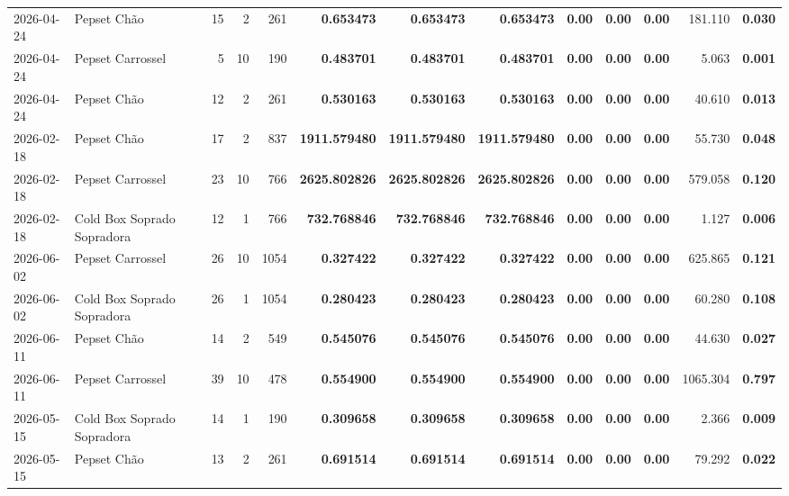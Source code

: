 {\begin{center}
{\begin{tabular}{@{}llrrrrrrrrrrr@{}}
2026-04-24 & Pepset Chão & 15 & 2 & 261 & \textbf{0.653473} & \textbf{0.653473} & \textbf{0.653473} & \textbf{0.00} & \textbf{0.00} & \textbf{0.00} & 181.110 & \textbf{0.030} \\
2026-04-24 & Pepset Carrossel & 5 & 10 & 190 & \textbf{0.483701} & \textbf{0.483701} & \textbf{0.483701} & \textbf{0.00} & \textbf{0.00} & \textbf{0.00} & 5.063 & \textbf{0.001} \\
2026-04-24 & Pepset Chão & 12 & 2 & 261 & \textbf{0.530163} & \textbf{0.530163} & \textbf{0.530163} & \textbf{0.00} & \textbf{0.00} & \textbf{0.00} & 40.610 & \textbf{0.013} \\
2026-02-18 & Pepset Chão & 17 & 2 & 837 & \textbf{1911.579480} & \textbf{1911.579480} & \textbf{1911.579480} & \textbf{0.00} & \textbf{0.00} & \textbf{0.00} & 55.730 & \textbf{0.048} \\
2026-02-18 & Pepset Carrossel & 23 & 10 & 766 & \textbf{2625.802826} & \textbf{2625.802826} & \textbf{2625.802826} & \textbf{0.00} & \textbf{0.00} & \textbf{0.00} & 579.058 & \textbf{0.120} \\
2026-02-18 & Cold Box Soprado Sopradora & 12 & 1 & 766 & \textbf{732.768846} & \textbf{732.768846} & \textbf{732.768846} & \textbf{0.00} & \textbf{0.00} & \textbf{0.00} & 1.127 & \textbf{0.006} \\
2026-06-02 & Pepset Carrossel & 26 & 10 & 1054 & \textbf{0.327422} & \textbf{0.327422} & \textbf{0.327422} & \textbf{0.00} & \textbf{0.00} & \textbf{0.00} & 625.865 & \textbf{0.121} \\
2026-06-02 & Cold Box Soprado Sopradora & 26 & 1 & 1054 & \textbf{0.280423} & \textbf{0.280423} & \textbf{0.280423} & \textbf{0.00} & \textbf{0.00} & \textbf{0.00} & 60.280 & \textbf{0.108} \\
2026-06-11 & Pepset Chão & 14 & 2 & 549 & \textbf{0.545076} & \textbf{0.545076} & \textbf{0.545076} & \textbf{0.00} & \textbf{0.00} & \textbf{0.00} & 44.630 & \textbf{0.027} \\
2026-06-11 & Pepset Carrossel & 39 & 10 & 478 & \textbf{0.554900} & \textbf{0.554900} & \textbf{0.554900} & \textbf{0.00} & \textbf{0.00} & \textbf{0.00} & 1065.304 & \textbf{0.797} \\
2026-05-15 & Cold Box Soprado Sopradora & 14 & 1 & 190 & \textbf{0.309658} & \textbf{0.309658} & \textbf{0.309658} & \textbf{0.00} & \textbf{0.00} & \textbf{0.00} & 2.366 & \textbf{0.009} \\
2026-05-15 & Pepset Chão & 13 & 2 & 261 & \textbf{0.691514} & \textbf{0.691514} & \textbf{0.691514} & \textbf{0.00} & \textbf{0.00} & \textbf{0.00} & 79.292 & \textbf{0.022} \\

\end{tabular}}
\end{center}}
